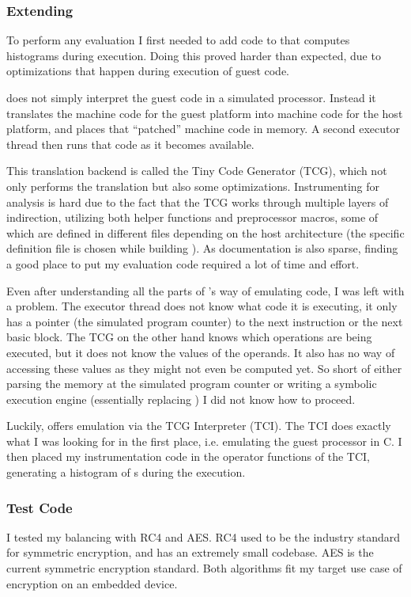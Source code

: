 \subsubsection{Extending \qemu{}}
To perform any evaluation I first needed to add code to \qemu{} that computes \hammingw{} histograms during execution.
Doing this proved harder than expected, due to optimizations that happen during execution of guest code.

\qemu{} does not simply interpret the guest code in a simulated processor.
Instead it translates the machine code for the guest platform into machine code for the host platform, and places that ``patched'' machine code in memory.
A second executor thread then runs that code as it becomes available.

This translation backend is called the Tiny Code Generator (TCG), which not only performs the translation but also some optimizations.
Instrumenting \qemu{} for analysis is hard due to the fact that the TCG works through multiple layers of indirection, utilizing both helper functions and preprocessor macros, some of which are defined in different files depending on the host architecture (the specific definition file is chosen while building \qemu{}).
As documentation is also sparse, finding a good place to put my evaluation code required a lot of time and effort.

Even after understanding all the parts of \qemu{}'s way of emulating code, I was left with a problem.
The executor thread does not know what code it is executing, it only has a pointer (the simulated program counter) to the next instruction or the next basic block.
The TCG on the other hand knows which operations are being executed, but it does not know the values of the operands.
It also has no way of accessing these values as they might not even be computed yet.
So short of either parsing the memory at the simulated program counter or writing a symbolic execution engine (essentially replacing \qemu{}) I did not know how to proceed.

Luckily, \qemu{} offers emulation via the TCG Interpreter (TCI).
The TCI does exactly what I was looking for in the first place, i.e. emulating the guest processor in C.
I then placed my instrumentation code in the operator functions of the TCI, generating a histogram of \hammingw{}s during the execution.

\subsubsection{Test Code}
I tested my balancing with RC4\cite{rc4} and AES\cite{daemen2013design}.
RC4 used to be the industry standard for symmetric encryption, and has an extremely small codebase.
AES is the current symmetric encryption standard.
Both algorithms fit my target use case of encryption on an embedded device.

